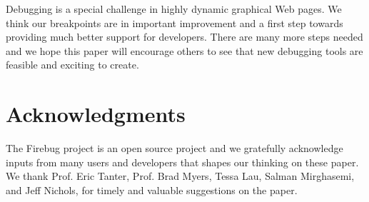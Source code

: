 \documentclass{www2010-accepted}
\begin{document}
Debugging is a special challenge in highly dynamic graphical Web pages.
We think our breakpoints are in important improvement and a first step towards
providing much better support for developers. There are many more steps needed
and we hope this paper will encourage others to see that new debugging tools are
feasible and exciting to create.


\section{Acknowledgments}
The Firebug project is an open source project and we gratefully
acknowledge inputs from many users and developers that shapes our
thinking on these paper. We thank Prof. Eric Tanter, Prof. Brad Myers,
Tessa Lau, Salman Mirghasemi, and Jeff Nichols, for timely and
valuable suggestions on the paper.
\end{document}
